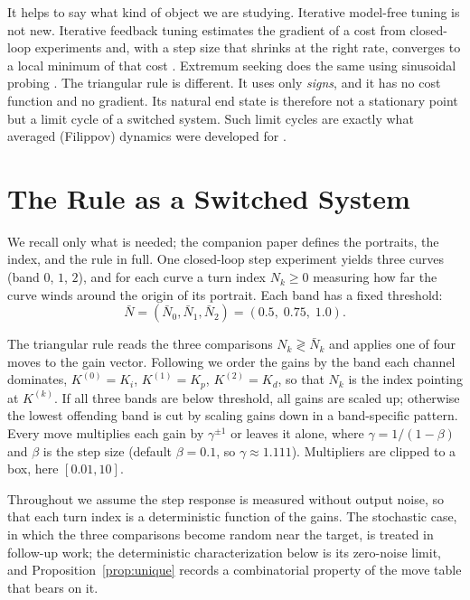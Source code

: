 \documentclass[letterpaper, 10pt, conference, twocolumn]{ieeeconf}
\newcommand{\Nbar}{\bar{N}}
\begin{document}
It helps to say what kind of object we are studying. Iterative model-free
tuning is not new. Iterative feedback tuning estimates the gradient of a cost
from closed-loop experiments and, with a step size that shrinks at the right
rate, converges to a local minimum of that cost \cite{Hjalmarsson1998}.
Extremum seeking does the same using sinusoidal probing
\cite{Killingsworth2006}. The triangular rule is different. It uses only
\emph{signs}, and it has no cost function and no gradient. Its natural end
state is therefore not a stationary point but a limit cycle of a switched
system. Such limit cycles are exactly what averaged (Filippov) dynamics were
developed for \cite{Filippov1988}.

\section{The Rule as a Switched System}
\label{sec:rule}

We recall only what is needed; the companion paper \cite{Paper1} defines the
portraits, the index, and the rule in full. One closed-loop step experiment
yields three curves (band $0$, $1$, $2$), and for each curve a turn index
$N_k \ge 0$ measuring how far the curve winds around the origin of its
portrait. Each band has a fixed threshold:
\begin{equation}
\Nbar = (\Nbar_0, \Nbar_1, \Nbar_2) = (0.5,\; 0.75,\; 1.0).
\label{eq:thresholds}
\end{equation}

The triangular rule reads the three comparisons $N_k \gtrless \Nbar_k$ and
applies one of four moves to the gain vector. Following \cite{Paper1} we
order the gains by the band each channel dominates,
$K^{(0)} = K_i$, $K^{(1)} = K_p$, $K^{(2)} = K_d$, so that $N_k$ is the index
pointing at $K^{(k)}$. If all
three bands are below threshold, all gains are scaled up; otherwise the lowest
offending band is cut by scaling gains down in a band-specific pattern. Every
move multiplies each gain by $\gamma^{\pm 1}$ or leaves it alone, where
$\gamma = 1/(1-\beta)$ and $\beta$ is the step size (default $\beta = 0.1$,
so $\gamma \approx 1.111$). Multipliers are clipped to a box, here
$[0.01, 10]$.

Throughout we assume the step response is measured without output noise, so
that each turn index is a deterministic function of the gains. The stochastic
case, in which the three comparisons become random near the target, is treated
in follow-up work; the deterministic characterization below is its zero-noise
limit, and Proposition~\ref{prop:unique} records a combinatorial property of
the move table that bears on it.
\end{document}

